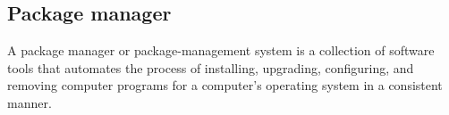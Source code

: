 \subsection*{Package manager}
A package manager or package-management system is a collection of software tools that automates the process of installing, upgrading, configuring, and removing computer programs for a computer's operating system in a consistent manner.